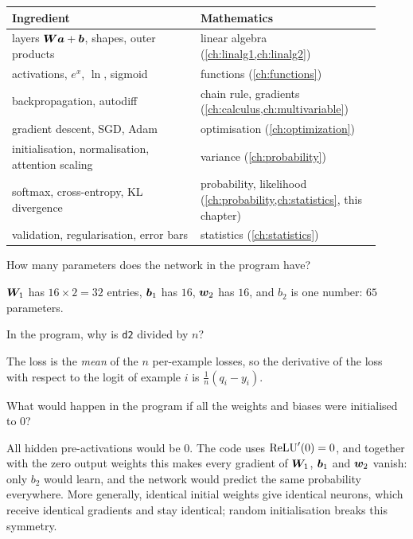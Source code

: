 \begin{keytakeaways}
\renewcommand{\arraystretch}{1.25}
\begin{tabular}{@{}>{\raggedright\arraybackslash}p{0.47\linewidth}
                >{\raggedright\arraybackslash}p{0.45\linewidth}@{}}
\textbf{Ingredient} & \textbf{Mathematics}\\
\hline
layers $\bm{W}\bm{a} + \bm{b}$, shapes, outer products & linear algebra (\cref{ch:linalg1,ch:linalg2})\\
activations, $e^x$, $\ln$, sigmoid & functions (\cref{ch:functions})\\
backpropagation, autodiff & chain rule, gradients (\cref{ch:calculus,ch:multivariable})\\
gradient descent, SGD, Adam & optimisation (\cref{ch:optimization})\\
initialisation, normalisation, attention scaling & variance (\cref{ch:probability})\\
softmax, cross-entropy, KL divergence & probability, likelihood (\cref{ch:probability,ch:statistics}, this chapter)\\
validation, regularisation, error bars & statistics (\cref{ch:statistics})
\end{tabular}
\end{keytakeaways}

\sectionexercises

\begin{exercise}
How many parameters does the network in the program have?
\end{exercise}
\begin{solution}
$\bm{W}_1$ has $16\times2 = 32$ entries, $\bm{b}_1$ has $16$, $\bm{w}_2$ has $16$, and $b_2$ is one
number: $65$ parameters.
\end{solution}

\begin{exercise}
In the program, why is \texttt{d2} divided by $n$?
\end{exercise}
\begin{solution}
The loss is the \emph{mean} of the $n$ per-example losses, so the derivative of the
loss with respect to the logit of example $i$ is $\tfrac1n(q_i - y_i)$.
\end{solution}

\begin{exercise}
What would happen in the program if all the weights and biases were initialised
to $0$?
\end{exercise}
\begin{solution}
All hidden pre-activations would be $0$. The code uses $\operatorname{ReLU}'(0) = 0$, and
together with the zero output weights this makes every gradient of $\bm{W}_1$,
$\bm{b}_1$ and $\bm{w}_2$ vanish: only $b_2$ would learn, and the network would
predict the same probability everywhere. More generally, identical initial
weights give identical neurons, which receive identical gradients and stay
identical; random initialisation breaks this symmetry.
\end{solution}

